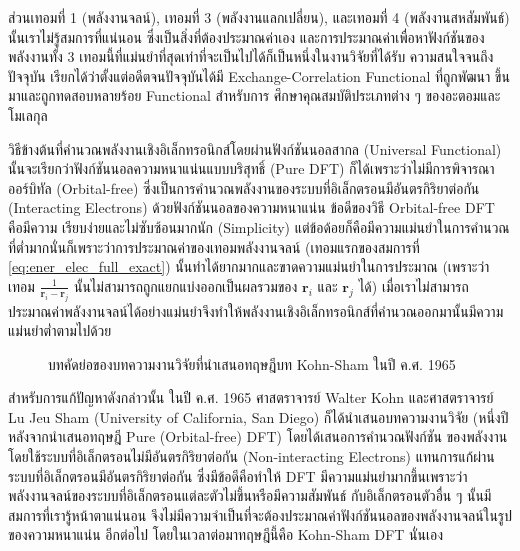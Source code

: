 \noindent ส่วนเทอมที่ 1 (พลังงานจลน์), เทอมที่ 3 (พลังงานแลกเปลี่ยน), และเทอมที่ 4 (พลังงานสหสัมพันธ์) นั้นเราไม่รู้สมการที่แน่นอน%
ซึ่งเป็นสิ่งที่ต้องประมาณค่าเอง และการประมาณค่าเพื่อหาฟังก์ชันของพลังงานทั้ง 3 เทอมนี้ที่แม่นยำที่สุดเท่าที่จะเป็นไปได้ก็เป็นหนึ่งในงานวิจัยที่ได้รับ%
ความสนใจจนถึงปัจจุบัน\autocite{peverati2014} เรียกได้ว่าตั้งแต่อดีตจนปัจจุบันได้มี Exchange-Correlation Functional ที่ถูกพัฒนา%
ขึ้นมาและถูกทดสอบหลายร้อย Functional\autocite{ernzerhof1999,dev2012,peverati2012,zhang2013,kanungo2019} สำหรับการ%
ศึกษาคุณสมบัติประเภทต่าง ๆ ของอะตอมและโมเลกุล\autocite{han2018,sharma2018,borlido2019,fabiano2019,cardeynaels2020,%
deoliveira2021,moldabekov2022}

วิธีข้างต้นที่คำนวณพลังงานเชิงอิเล็กทรอนิกส์โดยผ่านฟังก์ชันนอลสากล (Universal Functional) นั้นจะเรียกว่าฟังก์ชันนอลความหนาแน่นแบบบริสุทธิ์ 
(Pure DFT) ก็ได้เพราะว่าไม่มีการพิจารณาออร์บิทัล (Orbital-free) ซึ่งเป็นการคำนวณพลังงานของระบบที่อิเล็กตรอนมีอันตรกิริยาต่อกัน 
(Interacting Electrons) ด้วยฟังก์ชันนอลของความหนาแน่น\autocite{ligneres2005} ข้อดีของวิธี Orbital-free DFT คือมีความ%
เรียบง่ายและไม่ซับซ้อนมากนัก (Simplicity) แต่ข้อด้อยก็คือมีความแม่นยำในการคำนวณที่ต่ำมากนั่นก็เพราะว่าการประมาณค่าของเทอมพลังงานจลน์ 
(เทอมแรกของสมการที่ \ref{eq:ener_elec_full_exact}) นั้นทำได้ยากมากและขาดความแม่นยำในการประมาณ (เพราะว่าเทอม 
$\frac{1}{\bm{r}_{i} - \bm{r}_{j}}$ นั้นไม่สามารถถูกแยกแบ่งออกเป็นผลรวมของ $\bm{r}_{i}$ และ $\bm{r}_{j}$ ได้) 
เมื่อเราไม่สามารถประมาณค่าพลังงานจลน์ได้อย่างแม่นยำจึงทำให้พลังงานเชิงอิเล็กทรอนิกส์ที่คำนวณออกมานั้นมีความแม่นยำต่ำตามไปด้วย 

\begin{figure}[H]
    \centering
    \caption{บทคัดย่อของบทความงานวิจัยที่นำเสนอทฤษฎีบท Kohn-Sham ในปี ค.ศ. 1965}
    \label{fig:kohn_sham_abs}
\end{figure}

สำหรับการแก้ปัญหาดังกล่าวนั้น ในปี ค.ศ. 1965 ศาสตราจารย์ Walter Kohn และศาสตราจารย์ Lu Jeu Sham (University of California, 
San Diego) ก็ได้นำเสนอบทความงานวิจัย (หนึ่งปีหลังจากนำเสนอทฤษฎี Pure (Orbital-free) DFT) โดยได้เสนอการคำนวณฟังก์ชัน%
ของพลังงานโดยใช้ระบบที่อิเล็กตรอนไม่มีอันตรกิริยาต่อกัน (Non-interacting Electrons) แทนการแก้ผ่านระบบที่อิเล็กตรอนมีอันตรกิริยาต่อกัน%
\autocite{kohn1965} ซึ่งมีข้อดีคือทำให้ DFT มีความแม่นยำมากขึ้นเพราะว่าพลังงานจลน์ของระบบที่อิเล็กตรอนแต่ละตัวไม่ขึ้นหรือมีความสัมพันธ์%
กับอิเล็กตรอนตัวอื่น ๆ นั้นมีสมการที่เรารู้หน้าตาแน่นอน จึงไม่มีความจำเป็นที่จะต้องประมาณค่าฟังก์ชันนอลของพลังงานจลน์ในรูปของความหนาแน่น%
อีกต่อไป โดยในเวลาต่อมาทฤษฎีนี้คือ Kohn-Sham DFT นั่นเอง

